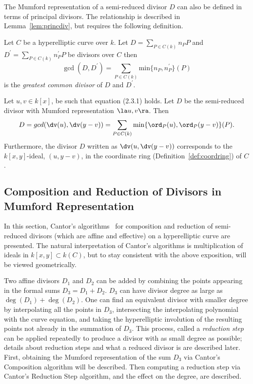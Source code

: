 The Mumford representation of a semi-reduced divisor $D$ can also be defined in
terms of principal divisors. The relationship is described in
Lemma~\ref{lem:princdiv}, but requires the following definition.


\bd\label{lem:gcd}
\cite[Adapted from Example~10.3.8]{Galbraith_PKC_2012} Let
$C$ be a hyperelliptic curve over $k$. Let $D = \sum_{P \in C(k)} n_P P$ and
$D^{\prime} = \sum_{P \in C(k)} n^{\prime}_P P$ be divisors over $C$ then $$
\gcd(D,D^{\prime}) = \sum_{P\in C(k)} \mathrm{min}\{n_P, n^{\prime}_P \}(P)$$ is
the \emph{greatest common divisor} of $D$ and $D^{\prime}$.
\ed

\bl\label{lem:princdiv}
\cite[Adapted from Example~10.3.8]{Galbraith_PKC_2012}
Let $u,v \in k[x]$, be such that equation (2.3.1) holds. Let $D$ be the
semi-reduced divisor with Mumford representation $\la u,v \ra$. Then $$ D =
gcd(\dv(u), \dv(y-v)) = \sum_{P \in C(k)} \mathrm{min}\{\ord_P(u),
\ord_P(y-v)\}(P).$$ Furthermore, the divisor $D$ written as $\dv(u,\dv(y-v))$
corresponds to the $k[x,y]$-ideal, $(u, y-v)$, in the coordinate ring
(Definition~\ref{def:coordring}) of $C$.
\el

\subsection{Composition and Reduction of Divisors in Mumford Representation}
\label{sec:semicantor}
In this section, Cantor's algorithms~\cite{Cantor_compjac_1987} for composition
and reduction of semi-reduced divisors (which are affine and effective)  on a
hyperelliptic curve are presented. The natural interpretation of Cantor's
algorithms is multiplication of ideals in $k[x,y] \subset k(C)$, but to stay
consistent with the above exposition, will be viewed geometrically.

Two affine divisors $D_1$ and $D_2$ can be added by combining the points
appearing in the formal sums $D_3 = D_1 + D_2$. $D_3$ can have divisor degree as
large as $\deg(D_1) + \deg(D_2)$. One can find an equivalent divisor with
smaller degree by interpolating all the points in $D_3$, intersecting the
interpolating polynomial with the curve equation, and taking the hyperelliptic
involution of the resulting points not already in the summation of $D_3$. This
process, called a \emph{reduction step} can be applied repeatedly to produce a
divisor with as small degree as possible; details about reduction steps and what
a reduced divisor is are described later. First, obtaining the Mumford
representation of the sum $D_3$ via Cantor's Composition algorithm
will be described. Then computing a reduction step via Cantor's Reduction Step
algorithm, and the effect on the degree, are described.

